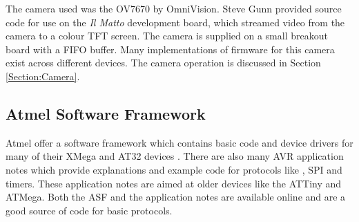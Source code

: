 The camera used was the OV7670 by OmniVision. Steve Gunn provided source code for use on the \textit{Il Matto} development board, which streamed video from the camera to a colour TFT screen. The camera is supplied on a small breakout board with a FIFO buffer. Many implementations of firmware for this camera exist across different devices. The camera operation is discussed in Section \ref{Section:Camera}. 
\subsection{Atmel Software Framework}

Atmel offer a software framework which contains basic code and device drivers for many of their XMega and AT32 devices \citep{Atmel:ASF}. There are also many AVR application notes which provide explanations and example code for protocols like \itc , SPI and timers. These application notes are aimed at older devices like the ATTiny and ATMega. Both the ASF and the application notes are available online and are a good source of code for basic protocols.

%
%
%
%
%


